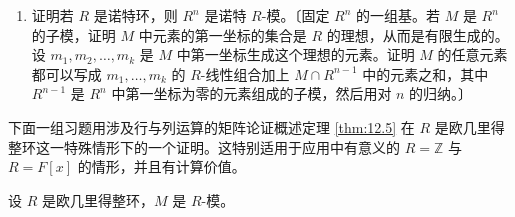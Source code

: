 \begin{enumerate}
\item 证明若 \(R\) 是诺特环，则 \(R^n\) 是诺特 \(R\)-模。〔固定 \(R^n\) 的一组基。若 \(M\) 是 \(R^n\) 的子模，证明 \(M\) 中元素的第一坐标的集合是 \(R\) 的理想，从而是有限生成的。设 \(m_1, m_2, \ldots, m_k\) 是 \(M\) 中第一坐标生成这个理想的元素。证明 \(M\) 的任意元素都可以写成 \(m_1, \ldots, m_k\) 的 \(R\)-线性组合加上 \(M \cap R^{n-1}\) 中的元素之和，其中 \(R^{n-1}\) 是 \(R^n\) 中第一坐标为零的元素组成的子模，然后用对 \(n\) 的归纳。〕
\end{enumerate}

\noindent 下面一组习题用涉及行与列运算的矩阵论证概述定理 \ref{thm:12.5} 在 \(R\) 是欧几里得整环这一特殊情形下的一个证明。这特别适用于应用中有意义的 \(R = \mathbb{Z}\) 与 \(R = F[x]\) 的情形，并且有计算价值。

\noindent 设 \(R\) 是欧几里得整环，\(M\) 是 \(R\)-模。

